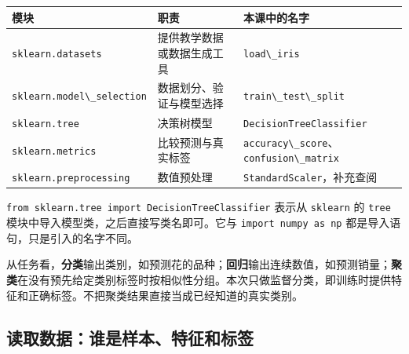 \documentclass[UTF8,a4paper,11pt,fontset=fandol]{ctexart}
\providecommand{\passthrough}[1]{#1}
\begin{document}
\begin{longtable}[]{@{}
  >{\raggedright\arraybackslash}p{}
  >{\raggedright\arraybackslash}p{}
  >{\raggedright\arraybackslash}p{}@{}}
\toprule\noalign{}
\begin{minipage}[b]{\linewidth}\raggedright
模块
\end{minipage} & \begin{minipage}[b]{\linewidth}\raggedright
职责
\end{minipage} & \begin{minipage}[b]{\linewidth}\raggedright
本课中的名字
\end{minipage} \\
\midrule\noalign{}
\endhead
\bottomrule\noalign{}
\endlastfoot
\passthrough{\lstinline!sklearn.datasets!} & 提供教学数据或数据生成工具 & \passthrough{\lstinline!load\_iris!} \\
\passthrough{\lstinline!sklearn.model\_selection!} & 数据划分、验证与模型选择 & \passthrough{\lstinline!train\_test\_split!} \\
\passthrough{\lstinline!sklearn.tree!} & 决策树模型 & \passthrough{\lstinline!DecisionTreeClassifier!} \\
\passthrough{\lstinline!sklearn.metrics!} & 比较预测与真实标签 & \passthrough{\lstinline!accuracy\_score!}、\passthrough{\lstinline!confusion\_matrix!} \\
\passthrough{\lstinline!sklearn.preprocessing!} & 数值预处理 & \passthrough{\lstinline!StandardScaler!}，补充查阅 \\
\end{longtable}

\passthrough{\lstinline!from sklearn.tree import DecisionTreeClassifier!} 表示从 \passthrough{\lstinline!sklearn!} 的 \passthrough{\lstinline!tree!} 模块中导入模型类，之后直接写类名即可。它与 \passthrough{\lstinline!import numpy as np!} 都是导入语句，只是引入的名字不同。

从任务看，\textbf{分类}输出类别，如预测花的品种；\textbf{回归}输出连续数值，如预测销量；\textbf{聚类}在没有预先给定类别标签时按相似性分组。本次只做监督分类，即训练时提供特征和正确标签。不把聚类结果直接当成已经知道的真实类别。

\subsection{读取数据：谁是样本、特征和标签}\label{ux8bfbux53d6ux6570ux636eux8c01ux662fux6837ux672cux7279ux5f81ux548cux6807ux7b7e}
\end{document}
